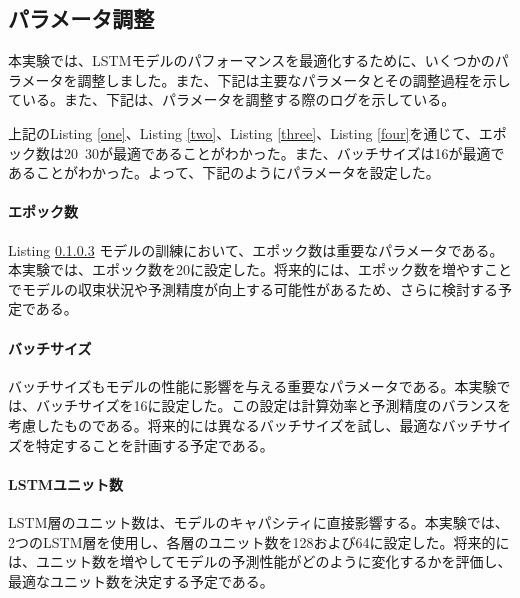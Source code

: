 \documentclass[a4paper, 11pt, titlepage]{jsarticle}
\begin{document}
\subsection{パラメータ調整}
\indent 本実験では、LSTMモデルのパフォーマンスを最適化するために、いくつかのパラメータを調整しました。また、下記は主要なパラメータとその調整過程を示している。また、下記は、パラメータを調整する際のログを示している。





\indent 上記のListing \ref{one}、Listing \ref{two}、Listing \ref{three}、Listing \ref{four}を通じて、エポック数は20~30が最適であることがわかった。また、バッチサイズは16が最適であることがわかった。よって、下記のようにパラメータを設定した。
\paragraph{エポック数}
\indent Listing \ref{}
\indent モデルの訓練において、エポック数は重要なパラメータである。本実験では、エポック数を20に設定した。将来的には、エポック数を増やすことでモデルの収束状況や予測精度が向上する可能性があるため、さらに検討する予定である。

\paragraph{バッチサイズ}
\indent バッチサイズもモデルの性能に影響を与える重要なパラメータである。本実験では、バッチサイズを16に設定した。この設定は計算効率と予測精度のバランスを考慮したものである。将来的には異なるバッチサイズを試し、最適なバッチサイズを特定することを計画する予定である。

\paragraph{LSTMユニット数}
\indent LSTM層のユニット数は、モデルのキャパシティに直接影響する。本実験では、2つのLSTM層を使用し、各層のユニット数を128および64に設定した。将来的には、ユニット数を増やしてモデルの予測性能がどのように変化するかを評価し、最適なユニット数を決定する予定である。
\end{document}
